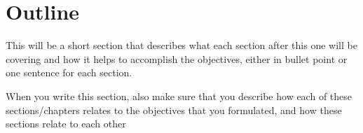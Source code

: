 \section{Outline}

This will be a short section that describes what each section after this one will be covering and how it helps to accomplish the objectives, either in bullet point or one sentence for each section.

When you write this section, also make sure that you describe how each of these sections/chapters relates to the objectives that you formulated, and how these sections relate to each other
